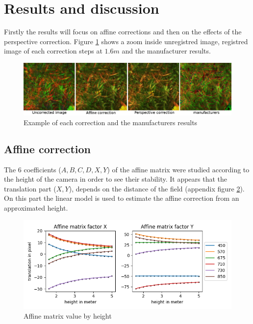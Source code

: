 \documentclass[]{elsarticle}
\begin{document}
	\section{Results and discussion}
	
	Firstly the results will focus on affine corrections and then on the effects of the perspective correction.
	Figure \ref{fig:merged-correction} shows a zoom inside unregistred image, registred image of each correction steps at $1.6m$ and the manufacturer results.
	
	\begin{figure}[H]
		\centering
		\includegraphics[width=0.7\linewidth]{../figures/merged-correction.png}
		\caption{Example of each correction and the manufacturers results}
		\label{fig:merged-correction}
	\end{figure}
	
	\subsection{Affine correction}
	
	The 6 coefficients ($A,B,C,D,X,Y$) of the affine matrix were studied according to the height of the camera in order to see their stability.
	It appears that the translation part ($X,Y$), depends on the distance of the field (appendix figure \ref{fig:affine-translation-height}).
	On this part the linear model is used to estimate the affine correction from an approximated height.
	
	\begin{figure}[H]
		\centering
		\includegraphics[width=0.5\linewidth]{../figures/affine-translation-height.png}
		\caption{Affine matrix value by height}
		\label{fig:affine-translation-height}
	\end{figure}
\end{document}
